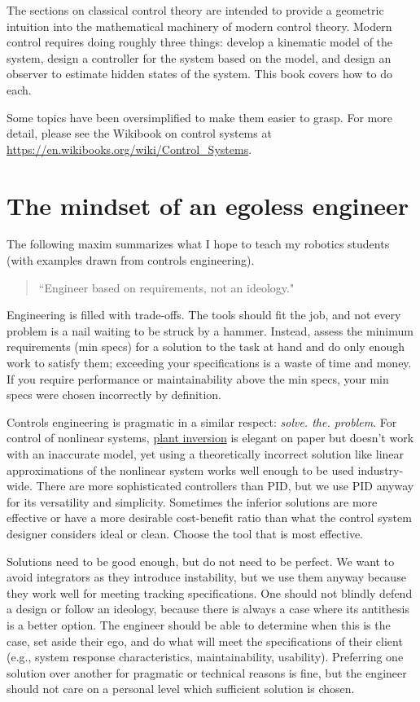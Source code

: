 The sections on classical control theory are intended to provide a geometric
intuition into the mathematical machinery of modern control theory. Modern
control requires doing roughly three things: develop a kinematic model of the
system, design a controller for the system based on the model, and design an
observer to estimate hidden states of the system. This book covers how to do
each.

Some topics have been oversimplified to make them easier to grasp. For more
detail, please see the Wikibook on control systems at
\url{https://en.wikibooks.org/wiki/Control_Systems}.

\section{The mindset of an egoless engineer}

The following maxim summarizes what I hope to teach my robotics students (with
examples drawn from controls engineering).

\begin{quote}
  ``Engineer based on requirements, not an ideology."
\end{quote}

Engineering is filled with trade-offs. The tools should fit the job, and not
every problem is a nail waiting to be struck by a hammer. Instead, assess the
minimum requirements (min specs) for a solution to the task at hand and do only
enough work to satisfy them; exceeding your specifications is a waste of time
and money. If you require performance or maintainability above the min specs,
your min specs were chosen incorrectly by definition.

Controls engineering is pragmatic in a similar respect:
\textit{solve. the. problem}. For control of nonlinear systems,
\href{https://faculty.washington.edu/devasia/Inversion.html}{plant inversion}
is elegant on paper but doesn't work with an inaccurate model, yet using a
theoretically incorrect solution like linear approximations of the nonlinear
system works well enough to be used industry-wide. There are more sophisticated
controllers than PID, but we use PID anyway for its versatility and simplicity.
Sometimes the inferior solutions are more effective or have a more desirable
cost-benefit ratio than what the control system designer considers ideal or
clean. Choose the tool that is most effective.

Solutions need to be good enough, but do not need to be perfect. We want to
avoid integrators as they introduce instability, but we use them anyway because
they work well for meeting tracking specifications. One should not blindly
defend a design or follow an ideology, because there is always a case where its
antithesis is a better option. The engineer should be able to determine when
this is the case, set aside their ego, and do what will meet the specifications
of their client (e.g., system response characteristics, maintainability,
usability). Preferring one solution over another for pragmatic or technical
reasons is fine, but the engineer should not care on a personal level which
sufficient solution is chosen.

